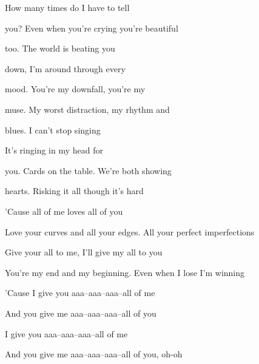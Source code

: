 \begin{song}
\bigskip

 How many times do I have to tell \par
{}you? Even when you're crying you're beautiful \par
{}too. The world is beating you \par
{}down, I'm around through every \par
{}mood. You're my downfall, you're my \par
{}muse. My worst distraction, my rhythm and  \par
{}blues. I can't stop singing \par
It's ringing in my head for \par

\bigskip

you. Cards on the table. We're both showing \par
{}hearts. Risking it all though it's hard \par

\bigskip

'Cause all of me loves all of you \par
Love your curves and all your edges. All your perfect imperfections \par
Give your all to me, I'll give my all to you \par
You're my end and my beginning. Even when I lose I'm winning \par
'Cause I give you aaa–aaa–aaa–all of me   \par
And you give me aaa–aaa–aaa–all of you  \par

\bigskip

I give you aaa–aaa–aaa–all of me   \par
And you give me aaa–aaa–aaa–all of you, oh-oh \par

\end{song}
